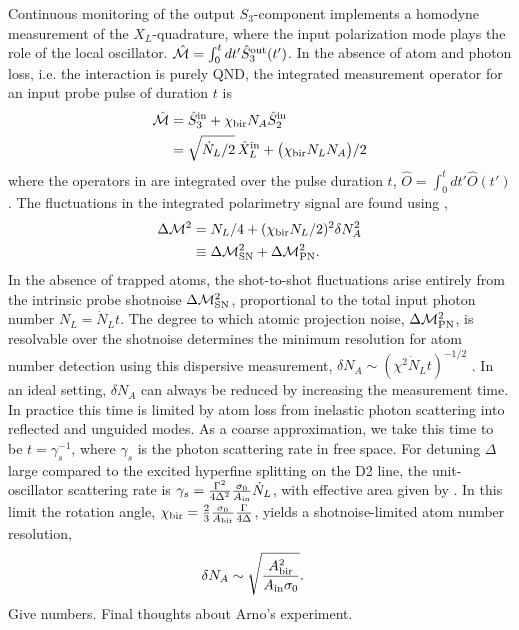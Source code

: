 \documentclass[preprint,aps,pra,onecolumn]{revtex4-1} %
\newcommand{\chibir}{\chi_{\rm bir}}
\newcommand{\shotnoise}{\Delta \mathcal{M}^2_{\rm SN}}
\newcommand{\projnoise}{\Delta \mathcal{M}^2_{\rm PN}}
\newcommand{\Abiref}{A_{\rm bir}}
\newcommand{\comment}[1]{{\color{Maroon} #1}}
\begin{document}
Continuous monitoring of the output $S_3$-component implements a homodyne measurement of the $X_L$-quadrature, where the input polarization mode plays the role of the local oscillator.  $\hat{\mathcal{M}} = \int_0^t dt' \hat{S}^{\rm out}_3(t')$. In the absence of atom and photon loss, i.e. the interaction is purely QND, the integrated measurement operator for an input probe pulse of duration $t$ is \cite{hammerer_quantum_2010}
	\begin{align} \label{Eq::OutputS3}
		\hat{\mathcal{M}} & = \hat{S}^{\rm in}_3 + \chibir N_A \hat{S}^{\rm in}_2 \\
		& = \sqrt{\dot{N}_L/2} \, \hat{X}_L^{\rm in} + \big( \chibir N_L N_A \big)/2 
	\end{align}
where the operators in  are integrated over the pulse duration $t$, $\hat{O} = \int_0^t dt' \hat{O}(t')$. The fluctuations in the integrated polarimetry signal are found using , 
	\begin{align}
		\Delta \mathcal{M}^2 &= N_L /4 + ( \chibir N_L /2 )^2 \delta N_A^2\label{Eq::MeasurementVariance}\\
			&\equiv \shotnoise + \projnoise.
	\end{align}
In the absence of trapped atoms, the shot-to-shot fluctuations arise entirely from the intrinsic probe shotnoise $\shotnoise$, proportional to the total input photon number $N_L = \dot{N}_Lt$. The degree to which atomic projection noise, $\projnoise$, is resolvable over the shotnoise determines the minimum resolution for atom number detection using this dispersive measurement, $\delta N_A \sim ( \chi^2 \dot{N}_L t )^{-1/2}$ \cite{smith_faraday_2003}.  In an ideal setting, $\delta N_A$ can always be reduced by increasing the measurement time. In practice this time is limited by atom loss from inelastic photon scattering into reflected and unguided modes. As a coarse approximation, we take this time to be $t=\gamma_s^{-1}$, where $\gamma_s$ is the photon scattering rate in free space.  For detuning $\Delta$ large compared to the excited hyperfine splitting on the D2 line, the unit-oscillator scattering rate is $\gamma_s = \frac{\Gamma^2}{4 \Delta^2}\frac{\sigma_0 }{A_{\rm in}} \dot{N}_L $, with effective area given by .  In this limit the rotation angle, $\chibir = \frac{2}{3} \frac{\sigma_0}{\Abiref}\frac{\Gamma}{4\Delta}$, yields a shotnoise-limited atom number resolution, 
	\begin{align} \label{Eq::AtomNumberResolution}
		\delta N_A  &\sim \sqrt {\frac{\Abiref^2}{A_{\rm in} \sigma_0}}.
	\end{align}
\comment{Give numbers. Final thoughts about Arno's experiment.} 
\end{document}
